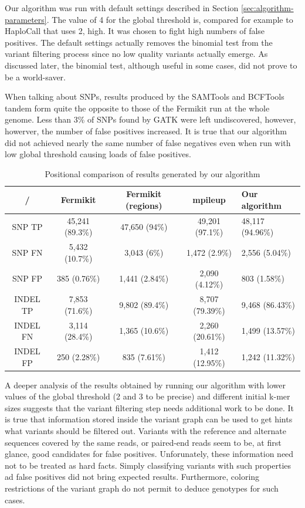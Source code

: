 Our algorithm was run with default settings described in Section \ref{sec:algorithm-parameters}. The value of 4 for the global threshold is, compared for example to HaploCall that uses 2, high. It was chosen to fight high numbers of false positives. The default settings actually removes the binomial test from the variant filtering process since no low quality variants actually emerge. As discussed later, the binomial test, although useful in some cases, did not prove to be a world-saver.

When talking about SNPs, results produced by the SAMTools and BCFTools tandem form quite the opposite to those of the Fermikit run at the whole genome. Less than 3\% of SNPs found by GATK were left undiscovered, however, howerver, the number of false positives increased. It is true that our algorithm did not achieved nearly the same number of false negatives even when run with low global threshold causing loads of false positives.

\begin{table}
\begin{center}
\caption{Positional comparison of results generated by our algorithm}
\label{tab:positional-results}
\begin{tabular}{| c | c | c | c | p{3cm} |}
\hline
/ & Fermikit & Fermikit (regions) & mpileup & Our algorithm \\
\hline
SNP TP & 45,241 (89.3\%) & 47,650 (94\%) & 49,201 (97.1\%) & 48,117 (94.96\%) \\
\hline
SNP FN & 5,432 (10.7\%) & 3,043 (6\%) & 1,472 (2.9\%) & 2,556 (5.04\%) \\
\hline
SNP FP & 385 (0.76\%) & 1,441 (2.84\%) & 2,090 (4.12\%) & 803 (1.58\%) \\
\hline
INDEL TP & 7,853 (71.6\%) & 9,802 (89.4\%) & 8,707 (79.39\%) & 9,468 (86.43\%) \\
\hline
INDEL FN & 3,114 (28.4\%) & 1,365 (10.6\%) & 2,260 (20.61\%) & 1,499 (13.57\%) \\
\hline
INDEL FP & 250 (2.28\%) & 835 (7.61\%) & 1,412 (12.95\%) & 1,242 (11.32\%) \\
\hline
\end{tabular}
\end{center}
\end{table}

A deeper analysis of the results obtained by running our algorithm with lower values of the global threshold (2 and 3 to be precise) and different initial k-mer sizes suggests that the variant filtering step needs additional work to be done. It is true that information stored inside the variant graph can be used to get hints what variants should be filtered out. Variants with the reference and alternate sequences covered by the same reads, or paired-end reads seem to be, at first glance, good candidates for false positives. Unforunately, these information need not to be treated as hard facts. Simply classifying variants with such properties ad false positives did not bring expected results. Furthermore, coloring restrictions of the variant graph do not permit to deduce genotypes for such cases.

